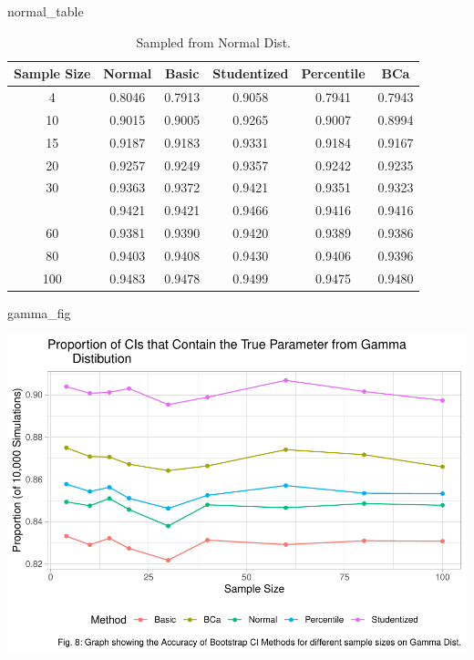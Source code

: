 \documentclass[12pt]{article}
\newenvironment{Shaded}{\begin{snugshade}}{\end{snugshade}}
\newcommand{\NormalTok}[1]{#1}
\begin{document}
\begin{Shaded}
\begin{Highlighting}[]
\NormalTok{normal\_table}
\end{Highlighting}
\end{Shaded}

\begin{table}

\caption{\label{tab:create graphs}Sampled from Normal Dist.}
\centering
\begin{tabular}[t]{cccccc}
\toprule
Sample Size & Normal & Basic & Studentized & Percentile & BCa\\
\midrule
4 & 0.8046 & 0.7913 & 0.9058 & 0.7941 & 0.7943\\
10 & 0.9015 & 0.9005 & 0.9265 & 0.9007 & 0.8994\\
15 & 0.9187 & 0.9183 & 0.9331 & 0.9184 & 0.9167\\
20 & 0.9257 & 0.9249 & 0.9357 & 0.9242 & 0.9235\\
30 & 0.9363 & 0.9372 & 0.9421 & 0.9351 & 0.9323\\
\addlinespace
40 & 0.9421 & 0.9421 & 0.9466 & 0.9416 & 0.9416\\
60 & 0.9381 & 0.9390 & 0.9420 & 0.9389 & 0.9386\\
80 & 0.9403 & 0.9408 & 0.9430 & 0.9406 & 0.9396\\
100 & 0.9483 & 0.9478 & 0.9499 & 0.9475 & 0.9480\\
\bottomrule
\end{tabular}
\end{table}

\begin{Shaded}
\begin{Highlighting}[]
\NormalTok{gamma\_fig}
\end{Highlighting}
\end{Shaded}

\includegraphics{paper_files/figure-latex/output the graphs/tables-3.pdf}
\end{document}
